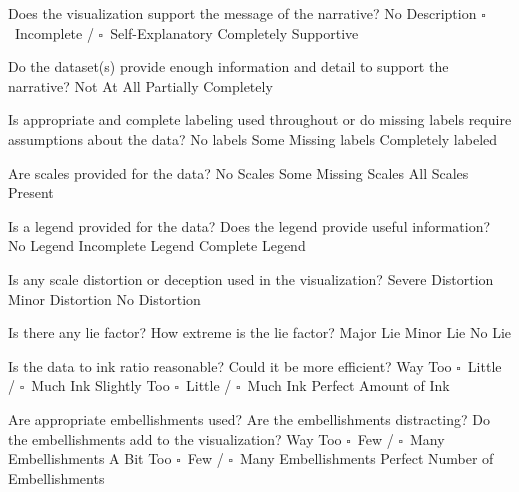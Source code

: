 \documentclass[a4paper,12pt]{article}
\begin{document}
	{Does the visualization support the message of the narrative?}
	{\choice No Description}
	{$\square$~Incomplete / $\square$~Self-Explanatory}
	{\choice Completely Supportive}
        
	{Do the dataset(s) provide enough information and detail to support 
    	the narrative?}
	{\choice Not At All}
	{\choice Partially}
	{\choice Completely}

\EndTable  


\vspace{15pt}

   	{Is appropriate and complete labeling used throughout or do 
      	missing labels require assumptions about the data?}
    {\choice No labels}
    {\choice Some Missing labels}
    {\choice Completely labeled} 
        
   	{Are scales provided for the data?}
	{\choice No Scales}
	{\choice Some Missing Scales}
	{\choice All Scales Present} 

	{Is a legend provided for the data? Does the legend provide useful 
    	information?}
	{\choice No Legend}
	{\choice Incomplete Legend}
	{\choice Complete Legend} 
        
        
	{Is any scale distortion or deception used in the visualization?}	
	{\choice Severe Distortion}
	{\choice Minor Distortion}
	{\choice No Distortion} 

	{Is there any lie factor? How extreme is the lie factor?}
	{\choice Major Lie}
	{\choice Minor Lie}
	{\choice No Lie} 

	{Is the data to ink ratio reasonable? Could it be more efficient?}
	{Way Too $\square$~Little / $\square$~Much Ink}
	{Slightly Too $\square$~Little / $\square$~Much Ink}
	{\choice Perfect Amount of Ink} 
        
\EndTable  
        


        
	{Are appropriate embellishments used? Are the embellishments 
    	distracting? Do the embellishments add to the visualization?}
	{Way Too $\square$~Few / $\square$~Many Embellishments}
	{A Bit Too $\square$~Few / $\square$~Many Embellishments}
	{\choice Perfect Number of Embellishments} 
        
\end{document}

